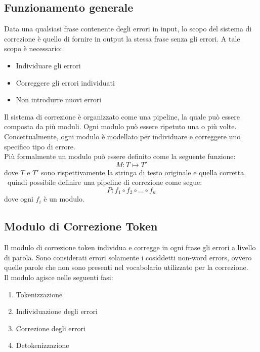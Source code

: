 \documentclass[12pt]{article}
\begin{document}
\subsection{Funzionamento generale}
Data una qualsiasi frase contenente degli errori in input, lo scopo del sistema di correzione è quello di fornire in output la stessa frase senza gli errori. A tale scopo è necessario:
\begin{itemize}
\item Individuare gli errori
\item Correggere gli errori individuati
\item Non introdurre nuovi errori
\end{itemize}
Il sistema di correzione è organizzato come una pipeline, la quale può essere composta da più moduli. Ogni modulo può essere ripetuto una o più volte. Concettualmente, ogni modulo è modellato per individuare e correggere uno specifico tipo di errore.\\
Più formalmente un modulo può essere definito come la seguente funzione:
\begin{equation}
M: T \mapsto T\prime
\end{equation}
dove $T$ e $T\prime$ sono rispettivamente la stringa di testo originale e quella corretta.\\
\E\ quindi possibile definire una pipeline di correzione come segue:
\begin{equation}
P: f_1 \circ f_2 \circ ... \circ f_n
\end{equation}
dove ogni $f_i$ è un modulo.

\subsection{Modulo di Correzione Token}
Il modulo di correzione token individua e corregge in ogni frase gli errori a livello di parola. Sono considerati errori solamente i cosiddetti non-word errors, ovvero quelle parole che non sono presenti nel vocabolario utilizzato per la correzione.\\
Il modulo agisce nelle seguenti fasi:
\begin{enumerate}
\item Tokenizzazione
\item Individuazione degli errori
\item Correzione degli errori
\item Detokenizzazione
\end{enumerate}
\end{document}
